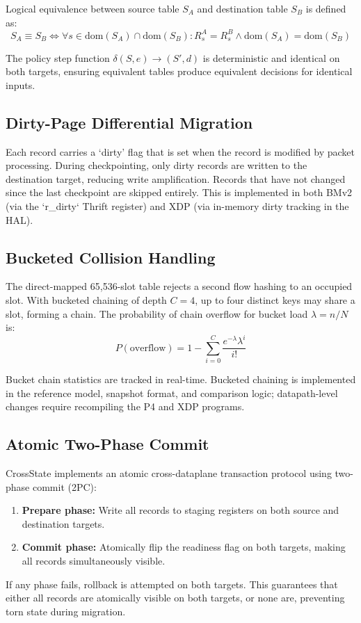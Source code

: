 \documentclass[10pt, conference, compsoc]{IEEEtran}
\begin{document}
Logical equivalence between source table $S_A$ and destination table $S_B$ is
defined as:
\begin{equation}
    S_A \equiv S_B \iff \forall s \in \text{dom}(S_A) \cap \text{dom}(S_B):
    R_s^A = R_s^B \land \text{dom}(S_A) = \text{dom}(S_B)
\label{eq:equivalence}
\end{equation}

The policy step function $\delta(S,e)\rightarrow(S',d)$ is deterministic and
identical on both targets, ensuring equivalent tables produce equivalent
decisions for identical inputs.

\subsection{Dirty-Page Differential Migration}
\label{subsec:dirty_page}
Each record carries a `dirty' flag that is set when the record is modified by
packet processing. During checkpointing, only dirty records are written to the
destination target, reducing write amplification. Records that have not changed
since the last checkpoint are skipped entirely. This is implemented in both
BMv2 (via the `r_dirty` Thrift register) and XDP (via in-memory dirty tracking
in the HAL).

\subsection{Bucketed Collision Handling}
\label{subsec:bucketed_chains}
The direct-mapped 65{,}536-slot table rejects a second flow hashing to an
occupied slot. With bucketed chaining of depth $C=4$, up to four distinct keys
may share a slot, forming a chain. The probability of chain overflow for bucket
load $\lambda = n/N$ is:
\begin{equation}
    P(\text{overflow}) = 1 - \sum_{i=0}^{C} \frac{e^{-\lambda}\lambda^i}{i!}
\label{eq:overflow}
\end{equation}

Bucket chain statistics are tracked in real-time. Bucketed chaining is
implemented in the reference model, snapshot format, and comparison logic;
datapath-level changes require recompiling the P4 and XDP programs.

\subsection{Atomic Two-Phase Commit}
\label{subsec:atomic}
CrossState implements an atomic cross-dataplane transaction protocol using
two-phase commit (2PC):
\begin{enumerate}
    \item \textbf{Prepare phase:} Write all records to staging registers on both
          source and destination targets.
    \item \textbf{Commit phase:} Atomically flip the readiness flag on both
          targets, making all records simultaneously visible.
\end{enumerate}
If any phase fails, rollback is attempted on both targets. This guarantees that
either all records are atomically visible on both targets, or none are,
preventing torn state during migration.
\end{document}
